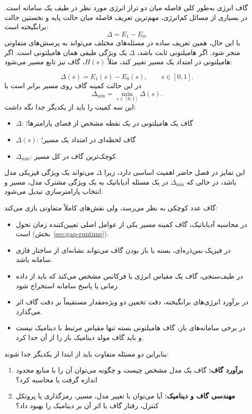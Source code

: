 گاف انرژی به‌طور کلی فاصله میان دو تراز انرژی مورد نظر در طیف یک سامانه است.
در بسیاری از مسائل کم‌انرژی، مهم‌ترین تعریف فاصله میان حالت پایه و نخستین حالت برانگیخته است:
\[	\Delta = E_1-E_0.
	\label{eq:general-spectral-gap}\]
با این حال، همین تعریف ساده در مسئله‌های مختلف می‌تواند به پرسش‌های متفاوتی منجر شود.
اگر هامیلتونی ثابت باشد، $\Delta$ یک ویژگی طیفی همان هامیلتونی است.
اگر هامیلتونی در امتداد یک مسیر تغییر کند، مثلاً $H(s)$، گاف نیز تابع مسیر می‌شود:

\[	\Delta(s)=E_1(s)-E_0(s),
	\qquad s\in[0,1].
	\label{eq:instantaneous-gap-general}\]
در این حالت کمینه گاف روی مسیر برابر است با
\[	\Delta_{\min}=
	\min_{s\in[0,1]}\Delta(s).
	\label{eq:minimum-gap-general}\]
این سه کمیت را باید از یکدیگر جدا نگه داشت:

\begin{itemize}
	\item $\Delta$: گاف یک هامیلتونی در یک نقطه مشخص از فضای پارامترها؛
	\item $\Delta(s)$: گاف لحظه‌ای در امتداد یک مسیر؛
	\item $\Delta_{\min}$: کوچک‌ترین گاف در کل مسیر.
\end{itemize}

این تمایز در فصل حاضر اهمیت اساسی دارد، زیرا $\Delta$ می‌تواند یک ویژگی فیزیکی مدل باشد، در حالی که $\Delta_{\min}$ در یک مسئله آدیاباتیک به یک ویژگی مشترک مدل، مسیر و انتخاب پارامترسازی تبدیل می‌شود.

گاف عدد کوچکی به نظر می‌رسد، ولی نقش‌های کاملاً متفاوتی بازی می‌کند:

\begin{itemize}
	\item در محاسبه آدیاباتیک، گاف کمینه مسیر یکی از عوامل اصلی تعیین‌کننده زمان تحول است (بخش~\ref{sec:gap-runtime}).
	\item در فیزیک بس‌ذره‌ای، بسته یا باز بودن گاف می‌تواند نشانه‌ای از ساختار فازی سامانه باشد.
	\item در طیف‌سنجی، گاف یک مقیاس انرژی یا فرکانس مشخص می‌کند که باید از داده زمانی یا پاسخ سامانه استخراج شود.
	\item در برآورد انرژی‌های برانگیخته، دقت تخمین دو ویژه‌مقدار مستقیماً بر دقت گاف اثر می‌گذارد.
	\item در برخی سامانه‌های باز، گاف هامیلتونی بسته تنها مقیاس مرتبط با دینامیک نیست و باید گاف مولد دینامیک باز را از آن جدا کرد.
\end{itemize}

بنابراین دو مسئله متفاوت باید از ابتدا از یکدیگر جدا شوند:

\begin{enumerate}
	\item \textbf{برآورد گاف:} گاف یک مدل مشخص چیست و چگونه می‌توان آن را با منابع محدود اندازه گرفت یا محاسبه کرد؟
	\item \textbf{مهندسی گاف و دینامیک:} آیا می‌توان با تغییر مدل، مسیر، رمزگذاری یا پروتکل کنترل، رفتار گاف یا اثر آن بر دینامیک را بهبود داد؟
\end{enumerate}

